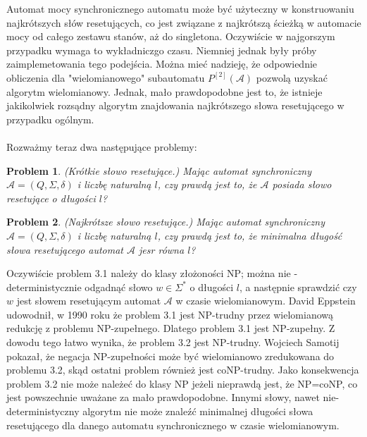\documentclass[12pt,a4paper]{article}
\newtheorem{pro}{Problem}[section]
\begin{document}
Automat mocy synchronicznego automatu mo\.ze by\'c u\.zyteczny w konstruowaniu najkr\'otszych s{\l}\'ow resetuj\k{a}cych, co jest zwi\k{a}zane z najkr\'otsz\k{a} \'scie\.zk\k{a} w automacie mocy od ca{\l}ego zestawu stan\'ow, a\.z do singletona. Oczywi\'scie w najgorszym przypadku wymaga to wyk{\l}adniczgo czasu. Niemniej jednak by{\l}y pr\'oby zaimplemetowania tego podej\'scia. Mo\.zna mie\'c nadziej\k{e}, \.ze odpowiednie obliczenia dla "wielomianowego" subautomatu $P^{[2]}(\mathscr{A})$ pozwol\k{a} uzyska\'c algorytm wielomianowy. Jednak, ma{\l}o prawdopodobne jest to, \.ze istnieje jakikolwiek rozs\k{a}dny algorytm znajdowania najkr\'otszego s{\l}owa resetuj\k{a}cego w przypadku og\'olnym.\\ 
\\
Rozwa\.zmy teraz dwa nast\k{e}puj\k{a}ce problemy:

\begin{pro}
(Kr\'otkie s{\l}owo resetuj\k{a}ce.) Maj\k{a}c automat synchroniczny  $\mathscr{A}=(Q, \Sigma, \delta)$ i liczb\k{e} naturaln\k{a} $l$, czy prawd\k{a} jest to, \.ze $\mathscr{A}$ posiada s{\l}owo resetuj\k{a}ce o d{\l}ugo\'sci $l$?
\end{pro}

\begin{pro} (Najkr\'otsze s{\l}owo resetuj\k{a}ce.) Maj\k{a}c automat synchroniczny  $\mathscr{A}=(Q, \Sigma, \delta)$ i liczb\k{e} naturaln\k{a} $l$, czy prawd\k{a} jest to, \.ze minimalna  d{\l}ugo\'s\'c s{\l}owa resetuj\k{a}cego automat $\mathscr{A}$ jesr r\'owna $l$?
\end{pro}

Oczywi\'scie problem 3.1 nale\.zy do klasy z{\l}o\.zono\'sci NP; mo\.zna nie -deterministycznie odgadn\k{a}\'c s{\l}owo $w\in\Sigma^{*}$ o d{\l}ugo\'sci $l$, a nast\k{e}pnie sprawdzi\'c czy $w$ jest s{\l}owem resetuj\k{a}cym automat $\mathscr{A}$ w czasie wielomianowym. David Eppstein udowodni{\l}, w 1990 roku \.ze problem 3.1 jest NP-trudny przez wielomianow\k{a} redukcj\k{e} z problemu NP-zupe{\l}nego. Dlatego problem 3.1 jest NP-zupe{\l}ny. Z dowodu tego {\l}atwo wynika, \.ze problem 3.2 jest NP-trudny. Wojciech Samotij pokaza{\l}, \.ze negacja NP-zupe{\l}no\'sci mo\.ze by\'c wielomianowo zredukowana do problemu 3.2, sk\k{a}d ostatni problem r\'ownie\.z jest coNP-trudny. Jako konsekwencja problem 3.2 nie mo\.ze nale\.ze\'c do klasy NP je\.zeli nieprawd\k{a} jest, \.ze NP=coNP, co jest powszechnie uwa\.zane za ma{\l}o prawdopodobne. Innymi s{\l}owy, nawet nie-deterministyczny algorytm nie mo\.ze znale\'z\'c minimalnej d{\l}ugo\'sci s{\l}owa resetuj\k{a}cego dla danego automatu synchronicznego w czasie wielomianowym.
\end{document}
